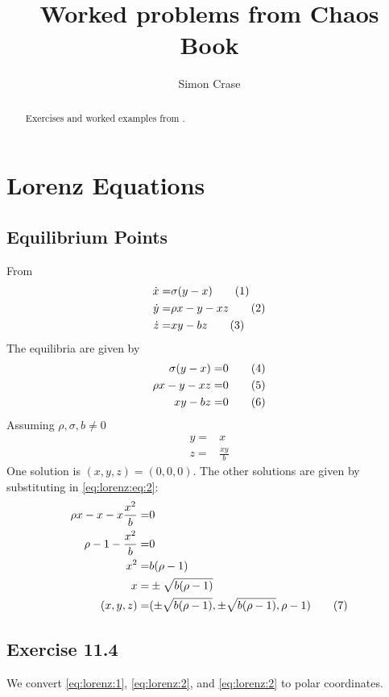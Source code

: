 \documentclass[]{article}
\title{Worked problems from Chaos Book}
\author{Simon Crase}
\newcommand\numberthis{\addtocounter{equation}{1}\tag{\theequation}}
\begin{document}
\maketitle

\begin{abstract}
Exercises and worked examples  from \cite{ChaosBook}.
\end{abstract}

\tableofcontents

\section{Lorenz Equations}

\subsection{Equilibrium Points}
From \cite{lorenz1963deterministic}
\begin{align*}
	\dot{x} =& \sigma(y-x) \numberthis \label{eq:lorenz:1}\\
	\dot{y} =& \rho x -y - xz \numberthis \label{eq:lorenz:2}\\
	\dot{z} =& xy-bz \numberthis \label{eq:lorenz:3}
\end{align*}
The equilibria are given by
\begin{align*}
	\sigma(y-x) =& 0\numberthis \label{eq:lorenz:eq:1}\\
	\rho x -y - xz  =& 0\numberthis \label{eq:lorenz:eq:2}\\
	xy-bz =& 0\numberthis \label{eq:lorenz:eq:3}
\end{align*}
Assuming $\rho, \sigma, b \ne 0$
\begin{align*}
	y =& x\\
	z =& \frac{xy}{b}
\end{align*}
One solution is $(x,y,z)= (0,0,0)$. The other solutions are given by substituting in \eqref{eq:lorenz:eq:2}:
\begin{align*}
	\rho x - x-x \frac{x^2}{b} =& 0\\
	\rho -1 - \frac {x^2}{b} =& 0\\
	x^2 =& b(\rho-1)\\
	x =& \pm \sqrt{ b(\rho-1)}\\
	(x,y,z)=& (\pm \sqrt{ b(\rho-1)},\pm \sqrt{ b(\rho-1)},\rho-1) \numberthis \label{eq:lorenz:eq:eq}
\end{align*}

\subsection{Exercise 11.4}
We convert  \eqref{eq:lorenz:1}, \eqref{eq:lorenz:2}, and  \eqref{eq:lorenz:2} to polar coordinates.
\end{document}
